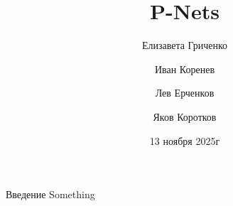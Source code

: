 \documentclass{beamer}
\title{P-Nets}
\author{Елизавета Гриченко \and Иван Коренев \and Лев Ерченков \and Яков Коротков }
\institute{303 группа}
\date{13 ноября 2025г}
\begin{document}
\maketitle

\begin{frame}{Введение}
Something
\end{frame}
\end{document}
